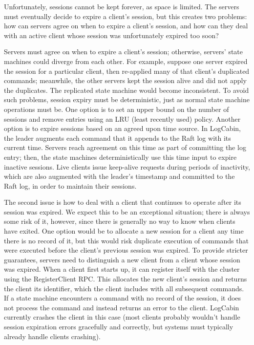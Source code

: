 Unfortunately, sessions cannot be kept forever, as space is
limited. The servers must eventually decide to expire a client's
session, but this creates two problems: how can servers agree on when to
expire a client's session, and how can they deal with an active client
whose session was unfortunately expired too soon?

Servers must agree on when to expire a client's session; otherwise,
servers' state machines could diverge from each other. For example,
suppose one server expired the session for a particular client, then
re-applied many of that client's duplicated commands; meanwhile, the
other servers kept the session alive and did not apply the duplicates.
The replicated state machine would become inconsistent. To avoid such
problems,
session expiry must be deterministic, just as normal state machine
operations must be. One option is to set an upper bound on the number
of sessions and remove entries using an LRU (least recently used)
policy. Another option is to expire sessions based on an agreed upon
time source. In LogCabin, the leader augments each command that it
appends to the Raft log with its current time. Servers reach
agreement on this time as part of committing the log entry; then, the
state machines deterministically use this time input to expire inactive
sessions. Live clients issue keep-alive requests during
periods of inactivity,
which are also augmented with the leader's timestamp and committed to
the Raft log, in order to maintain their sessions.

The second issue is how to deal with a client that continues to operate
after its session was expired. We expect this to be an exceptional
situation; there is always some risk of it, however, since there is
generally no way to know when clients have exited. One option would be
to allocate a new session for a client any time there is no record of
it, but this would risk duplicate execution of commands that were
executed before the client's previous session was expired.
To provide stricter guarantees,
servers need to distinguish a new client from a client whose session was
expired. When a client first starts up, it can register itself with
the cluster using the RegisterClient RPC. This
allocates the new client's session and returns the client its
identifier, which the client includes with all subsequent commands. If a
state machine encounters a command with no record of the session, it
does not process the command and instead returns an error to the client.
LogCabin currently crashes the client in this case (most clients
probably wouldn't handle session expiration errors gracefully and
correctly, but systems must typically already handle clients crashing).

